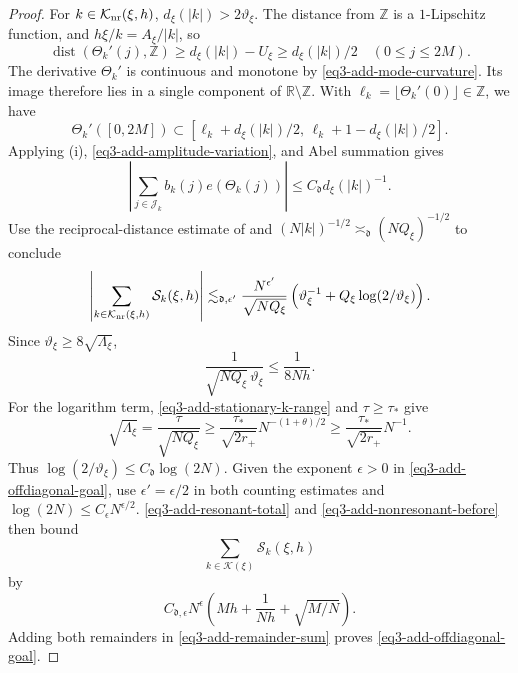 \documentclass[reqno,12pt]{amsart}
\def \Z {\mathbb Z}
\def \R {\mathbb R}
\numberwithin{equation}{section}
\begin{document}
\begin{proof}
For $k\in\mathcal K_{\rm nr}(\xi,h)$,
$d_\xi(|k|)>2\vartheta_\xi$. The distance from $\Z$ is a
$1$-Lipschitz function, and $h\xi/k=A_\xi/|k|$, so
\[
 \operatorname{dist}(\Theta_k'(j),\Z)
 \ge d_\xi(|k|)-U_\xi\ge d_\xi(|k|)/2
                              \quad(0\le j\le2M).
\]
The derivative $\Theta_k'$ is continuous and monotone by
\eqref{eq3-add-mode-curvature}. Its image therefore lies in a
single component of $\R\setminus\Z$. With $\ell_k=\lfloor\Theta_k'(0)\rfloor\in\Z$, we have
\[
 \Theta_k'([0,2M])\subset
 [\ell_k+d_\xi(|k|)/2,\,\ell_k+1-d_\xi(|k|)/2].
\]
Applying
(i),
\eqref{eq3-add-amplitude-variation}, and Abel summation gives
\[
 \left|\sum_{j\in\mathcal J_k}b_k(j)e(\Theta_k(j))\right|
       \le C_{\mathfrak d}d_\xi(|k|)^{-1}.
\]
Use the reciprocal-distance estimate of
 and
$(N|k|)^{-1/2}\asymp_{\mathfrak d}(NQ_\xi)^{-1/2}$ to conclude
\begin{equation}
 \left|\sum_{k\in\mathcal K_{\rm nr}(\xi,h)}\mathcal S_k(\xi,h)\right|
 \lesssim_{\mathfrak d,\epsilon'}
 \frac{N^{\epsilon'}}{\sqrt{NQ_\xi}}
       \left(\vartheta_\xi^{-1}
                     +Q_\xi\log(2/\vartheta_\xi)\right).
 \label{eq3-add-nonresonant-before}
\end{equation}
Since $\vartheta_\xi\ge8\sqrt{\Lambda_\xi}$,
\[
 \frac1{\sqrt{NQ_\xi}\,\vartheta_\xi}\le\frac1{8Nh}.
\]
For the logarithm term, \eqref{eq3-add-stationary-k-range} and
$\tau\ge\tau_*$ give
\[
 \sqrt{\Lambda_\xi}=\frac{\tau}{\sqrt{NQ_\xi}}
 \ge\frac{\tau_*}{\sqrt{2r_+}}N^{-(1+\theta)/2}
 \ge\frac{\tau_*}{\sqrt{2r_+}}N^{-1}.
\]
Thus $\log(2/\vartheta_\xi)\le C_{\mathfrak d}\log(2N)$.
Given the exponent $\epsilon>0$ in
\eqref{eq3-add-offdiagonal-goal}, use $\epsilon'=\epsilon/2$ in
both counting estimates and
$\log(2N)\le C_\epsilon N^{\epsilon/2}$.
\eqref{eq3-add-resonant-total} and
\eqref{eq3-add-nonresonant-before} then bound $$\sum_{k\in\mathcal K(\xi)}\mathcal S_k(\xi,h)$$
by
\[
 C_{\mathfrak d,\epsilon}N^\epsilon
       \left(Mh+\frac1{Nh}+\sqrt{M/N}\right).
\]
Adding both remainders in \eqref{eq3-add-remainder-sum} proves
\eqref{eq3-add-offdiagonal-goal}. 


\end{proof}
\end{document}

